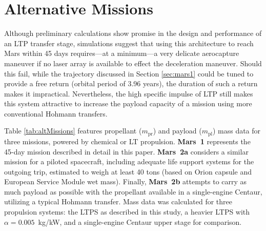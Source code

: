 \documentclass[final,3p,times,twocolumn,sort&compress, lefttitle]{elsarticle}
\begin{document}
    
    \section{Alternative Missions}
        \label{sec:altMissions}
        Although preliminary calculations show promise in the design and performance of an LTP transfer stage, simulations suggest that using this architecture to reach Mars within 45 days requires---at a minimum---a very delicate aerocapture maneuver if no laser array is available to effect the deceleration maneuver. Should this fail, while the trajectory discussed in Section \ref{sec:mars1} could be tuned to provide a free return (orbital period of 3.96 years), the duration of such a return makes it impractical. Nevertheless, the high specific impulse of LTP still makes this system attractive to increase the payload capacity of a mission using more conventional Hohmann transfers.
        
        Table \ref{tab:altMissions} features propellant ($m_\mathrm{pr}$) and payload ($m_\mathrm{pl}$) mass data for three missions, powered by chemical or LT propulsion. \textbf{Mars~1} represents the 45-day mission described in detail in this paper. \textbf{Mars~2a} considers a similar mission for a piloted spacecraft, including adequate life support systems for the outgoing trip, estimated to weigh at least 40 tons (based on Orion capsule and European Service Module wet mass). Finally, \textbf{Mars~2b} attempts to carry as much payload as possible with the propellant available in a single-engine Centaur, utilizing a typical Hohmann transfer. Mass data was calculated for three propulsion systems: the LTPS as described in this study, a heavier LTPS with $\alpha=0.005$~kg/kW, and a single-engine Centaur upper stage \cite{united_launch_alliance_atlas_2010} for comparison.
        
\end{document}
